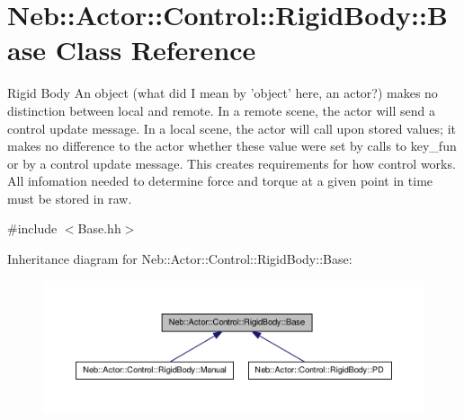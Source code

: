 \hypertarget{classNeb_1_1Actor_1_1Control_1_1RigidBody_1_1Base}{\section{\-Neb\-:\-:\-Actor\-:\-:\-Control\-:\-:\-Rigid\-Body\-:\-:\-Base \-Class \-Reference}
\label{classNeb_1_1Actor_1_1Control_1_1RigidBody_1_1Base}
}


\-Rigid \-Body \-An object (what did \-I mean by 'object' here, an actor?) makes no distinction between local and remote. \-In a remote scene, the actor will send a control update message. \-In a local scene, the actor will call upon stored values; it makes no difference to the actor whether these value were set by calls to key\-\_\-fun or by a control update message. \-This creates requirements for how control works. \-All infomation needed to determine force and torque at a given point in time must be stored in raw.  




{\ttfamily \#include $<$\-Base.\-hh$>$}



\-Inheritance diagram for \-Neb\-:\-:\-Actor\-:\-:\-Control\-:\-:\-Rigid\-Body\-:\-:\-Base\-:\nopagebreak
\begin{figure}[H]
\begin{center}
\leavevmode
\includegraphics[width=350pt]{classNeb_1_1Actor_1_1Control_1_1RigidBody_1_1Base__inherit__graph}
\end{center}
\end{figure}
